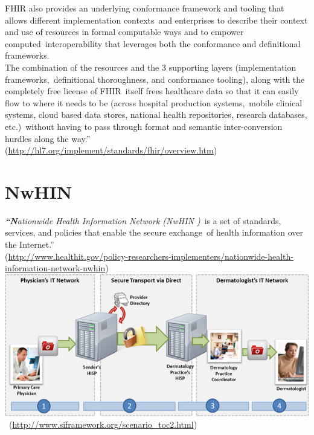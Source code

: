 \documentclass[DIV=calc, paper=a4, fontsize=12pt, onecolumn]{scrartcl}	 %
\newcommand{\initial}[1]{ %
\lettrine[lines=3,lhang=0.3,nindent=0em,slope=0em]{
\color{DarkBlue}
{\textbf{\textit{#1}}}}{}}
\begin{document}
FHIR also provides an underlying conformance framework and tooling that allows different implementation contexts\ 
and enterprises to describe their context and use of resources in formal computable ways and to empower computed\
 interoperability that leverages both the conformance and definitional frameworks.\\

The combination of the resources and the 3 supporting layers (implementation frameworks,\
definitional thoroughness, and conformance tooling), along with the completely free license of FHIR\
 itself frees healthcare data so that it can easily flow to where it needs to be (across hospital production systems,\
 mobile clinical systems, cloud based data stores, national health repositories, research databases, etc.)\
without having to pass through format and semantic inter-conversion hurdles along the way.”\\
 (\url{http://hl7.org/implement/standards/fhir/overview.htm})



\section[Nationwide Health Information Network (NwHIN)]{NwHIN}
  \label{sec:nwhin}

\initial{``N}\textit{ationwide Health Information Network (NwHIN )}\
is a set of standards, services, and policies that enable the secure exchange\
of health information over the Internet.''\\
(\url{http://www.healthit.gov/policy-researchers-implementers/nationwide-health-information-network-nwhin})\\

\includegraphics[scale=0.5]{nwhin.png}\\\
(\url{http://www.siframework.org/scenario_toc2.html})\
\end{document}
